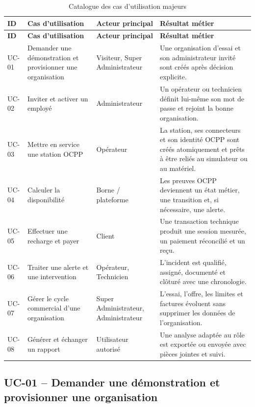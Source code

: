 \begingroup
\setlength{\tabcolsep}{5pt}
\begin{longtable}{|C{1.35cm}|p{4.0cm}|p{3.3cm}|p{5.3cm}|}
  \caption{Catalogue des cas d'utilisation majeurs}
  \label{tab:use-case-catalog}\\
  \hline
  \textbf{ID} & \textbf{Cas d'utilisation} & \textbf{Acteur principal} &
  \textbf{Résultat métier}\\
  \hline
  \endfirsthead
  \hline
  \textbf{ID} & \textbf{Cas d'utilisation} & \textbf{Acteur principal} &
  \textbf{Résultat métier}\\
  \hline
  \endhead
  UC-01 & Demander une démonstration et provisionner une organisation &
  Visiteur, Super Administrateur &
  Une organisation d'essai et son administrateur invité sont créés après décision
  explicite.\\\hline
  UC-02 & Inviter et activer un employé &
  Administrateur &
  Un opérateur ou technicien définit lui-même son mot de passe et rejoint la bonne
  organisation.\\\hline
  UC-03 & Mettre en service une station OCPP &
  Opérateur &
  La station, ses connecteurs et son identité OCPP sont créés atomiquement et prêts à
  être reliés au simulateur ou au matériel.\\\hline
  UC-04 & Calculer la disponibilité &
  Borne / plateforme &
  Les preuves OCPP deviennent un état métier, une transition et, si nécessaire, une
  alerte.\\\hline
  UC-05 & Effectuer une recharge et payer &
  Client &
  Une transaction technique produit une session mesurée, un paiement réconcilié et
  un reçu.\\\hline
  UC-06 & Traiter une alerte et une intervention &
  Opérateur, Technicien &
  L'incident est qualifié, assigné, documenté et clôturé avec une chronologie.\\\hline
  UC-07 & Gérer le cycle commercial d'une organisation &
  Super Administrateur, Administrateur &
  L'essai, l'offre, les limites et factures évoluent sans supprimer les données de
  l'organisation.\\\hline
  UC-08 & Générer et échanger un rapport &
  Utilisateur autorisé &
  Une analyse adaptée au rôle est exportée ou envoyée avec pièces jointes et suivi.\\
  \hline
\end{longtable}
\endgroup

\subsection{UC-01 -- Demander une démonstration et provisionner une organisation}

